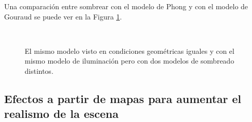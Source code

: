Una comparación entre sombrear con el modelo de Phong y con el modelo de Gouraud se puede ver en la Figura \ref{fig:shadingComparation}.
\begin{figure}[htp]
  \begin{center}
     \\
  \end{center}
  \caption[Comparación entre los modelos de sombreado de Gouraud y de Phong]{El mismo modelo visto en condiciones geométricas iguales y con el mismo modelo de iluminación pero con dos modelos de sombreado distintos.}
  \label{fig:shadingComparation}
\end{figure}

\subsection{Efectos a partir de mapas para aumentar el realismo de la escena}
